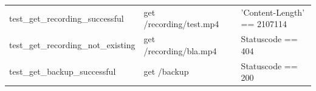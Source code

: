 \begin{table}[h]
{\begin{tabular}{llll}
test\_get\_recording\_successful       & get /recording/test.mp4 &                                                                                                                                    & 'Content-Length' == 2107114    \\
test\_get\_recording\_not\_existing    & get /recording/bla.mp4  &                                                                                                                                    & Statuscode == 404              \\
test\_get\_backup\_successful          & get /backup             &                                                                                                                                    & Statuscode == 200       	\end{tabular}}
\end{table}
